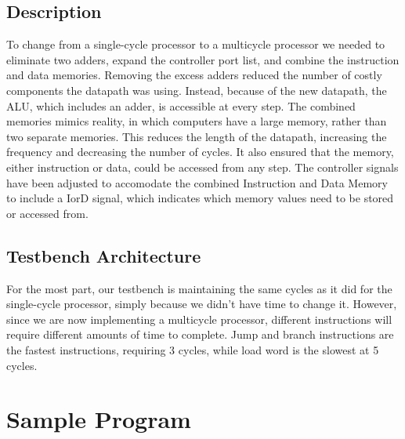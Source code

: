 \documentclass{article}
\begin{document}
\subsection{Description}
To change from a single-cycle processor to a multicycle processor we needed to eliminate two adders, expand the controller port list, and combine the instruction and data memories. Removing the excess adders reduced the number of costly components the datapath was using. Instead, because of the new datapath, the ALU, which includes an adder, is accessible at every step. The combined memories mimics reality, in which computers have a large memory, rather than two separate memories. This reduces the length of the datapath, increasing the frequency and decreasing the number of cycles. It also ensured that the memory, either instruction or data, could be accessed from any step. The controller signals have been adjusted to accomodate the combined Instruction and Data Memory to include a IorD signal, which indicates which memory values need to be stored or accessed from.

\subsection{Testbench Architecture}
For the most part, our testbench is maintaining the same cycles as it did for the single-cycle processor, simply because we didn't have time to change it. However, since we are now implementing a multicycle processor, different instructions will require different amounts of time to complete. Jump and branch instructions are the fastest instructions, requiring 3 cycles, while load word is the slowest at 5 cycles.


\section{Sample Program}
	
\end{document}

